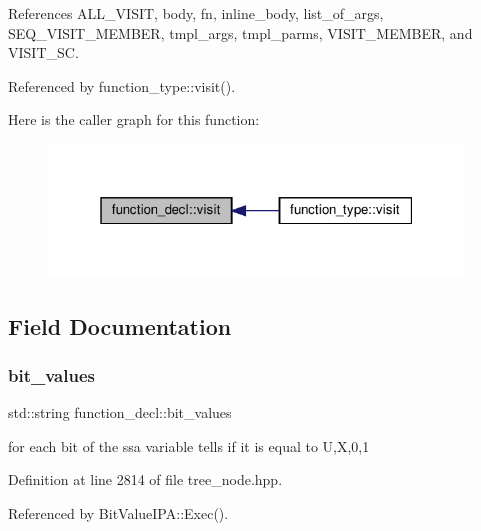 References A\+L\+L\+\_\+\+V\+I\+S\+IT, body, fn, inline\+\_\+body, list\+\_\+of\+\_\+args, S\+E\+Q\+\_\+\+V\+I\+S\+I\+T\+\_\+\+M\+E\+M\+B\+ER, tmpl\+\_\+args, tmpl\+\_\+parms, V\+I\+S\+I\+T\+\_\+\+M\+E\+M\+B\+ER, and V\+I\+S\+I\+T\+\_\+\+SC.



Referenced by function\+\_\+type\+::visit().

Here is the caller graph for this function\+:
\nopagebreak
\begin{figure}[H]
\begin{center}
\leavevmode
\includegraphics[width=313pt]{d0/d43/structfunction__decl_a49389fd3c1df13bb78dbc94e7350462e_icgraph}
\end{center}
\end{figure}


\subsection{Field Documentation}
\mbox{\label{structfunction__decl_a2c9b0b82e432d51912cf4f01d0adb320}} 
\subsubsection{\texorpdfstring{bit\+\_\+values}{bit\_values}}
{\footnotesize\ttfamily std\+::string function\+\_\+decl\+::bit\+\_\+values}



for each bit of the ssa variable tells if it is equal to U,X,0,1 



Definition at line 2814 of file tree\+\_\+node.\+hpp.



Referenced by Bit\+Value\+I\+P\+A\+::\+Exec().

\mbox{\label{structfunction__decl_ae505883753148cd4e4c29ad41de7110b}} 
